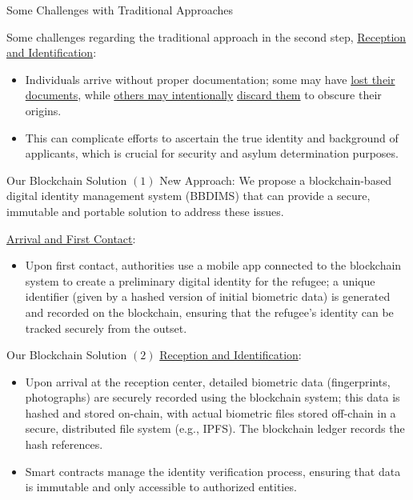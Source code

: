 \documentclass{beamer}
\begin{document}
\begin{frame}{Some Challenges with Traditional Approaches}

Some challenges regarding the traditional approach in the second step, \underline{Reception and Identification}: 
\begin{itemize}
\item Individuals arrive without proper documentation; some may have \underline{lost their documents}, while \underline{others may intentionally} \underline{discard them} to obscure their origins.
\item This can complicate efforts to ascertain the true identity and background of applicants, which is crucial for security and asylum determination purposes.
\end{itemize}
\end{frame}



\begin{frame}{Our Blockchain Solution $(1)$}
\alert{New Approach}: We propose a blockchain-based digital identity management system (BBDIMS) that can provide a secure, immutable and portable solution to address these issues.

\underline{Arrival and First Contact}:
\begin{itemize}
		\item Upon first contact, authorities use a mobile app connected to the blockchain system to create a preliminary digital identity for the refugee; a unique identifier (given by a hashed version of initial biometric data) is generated and recorded on the blockchain, ensuring that the refugee's identity can be tracked securely from the outset.
\end{itemize}

\end{frame}




\begin{frame}{Our Blockchain Solution $(2)$}
\underline{Reception and Identification}:
\begin{itemize}
		\item Upon arrival at the reception center, detailed biometric data (fingerprints, photographs) are securely recorded using the blockchain system; this data is hashed and stored on-chain, with actual biometric files stored off-chain in a secure, distributed file system (e.g., IPFS). The blockchain ledger records the hash references.
		\item Smart contracts manage the identity verification process, ensuring that data is immutable and only accessible to authorized entities.
\end{itemize}

\end{frame}
\end{document}
